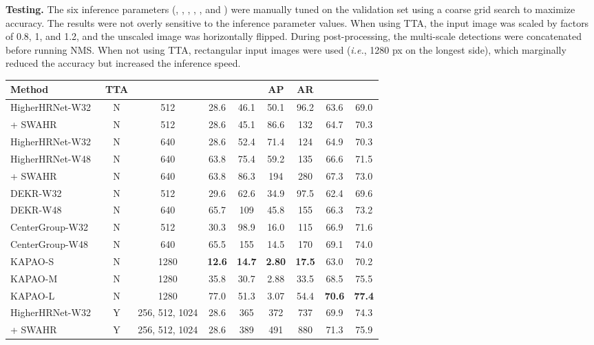 \documentclass[runningheads]{llncs}
\newcommand{\ie}{\textit{i.e.}}
\newcommand\hll[1]{\bgroup
  \hskip0pt\color{black}#1\egroup
}
\newcommand\hlll[1]{\bgroup
  \hskip0pt\color{black}#1\egroup
}
\begin{document}
\medskip\noindent\textbf{Testing.} The six inference parameters (, , , , , and ) were manually tuned on the validation set using a coarse grid search to maximize accuracy. The results were not overly sensitive to the inference parameter values. When using TTA, the input image was scaled by factors of 0.8, 1, and 1.2, and the unscaled image was horizontally flipped. During post-processing, the multi-scale detections \hlll{were} concatenated before running NMS. When not using TTA, rectangular input images were used (\ie, 1280 px on the longest side), which marginally reduced the accuracy but increased the inference speed. 

\begin{table}[t]
\footnotesize
\centering
\begin{tabular}{l|c|c|c|cc|c|c|c}
	\hline
	Method & TTA & \makecell{Input Size(s)} & \makecell{Params\ms)} & \makecell{PP\ms)} & AP & AR\\
	\hline
	HigherHRNet-W32~\cite{cheng2020higherhrnet} & N & 512 & 28.6 & 46.1 & 50.1 & 96.2 & 63.6 & 69.0\\
	\hll{\quad + SWAHR~\cite{luo2021rethinking}} & N & 512 & 28.6 & 45.1 & 86.6 & 132 & 64.7 & 70.3\\
HigherHRNet-W32~\cite{cheng2020higherhrnet} & N & 640 & 28.6 & 52.4 & 71.4 & 124 & 64.9 & 70.3\\  HigherHRNet-W48~\cite{cheng2020higherhrnet} & N & 640 & 63.8 & 75.4 & 59.2 & 135 & 66.6 & 71.5\\
	\hll{\quad + SWAHR~\cite{luo2021rethinking}} & N & 640 & 63.8 & 86.3 & 194 & 280 & 67.3 & 73.0\\ 
DEKR-W32~\cite{geng2021bottom} & N & 512 & 29.6 & 62.6 & 34.9 & 97.5 & 62.4 & 69.6\\ 
	DEKR-W48~\cite{geng2021bottom} & N & 640 & 65.7 & 109 & 45.8 & 155 & 66.3 & 73.2\\
	\hll{CenterGroup-W32~\cite{braso2021center}} & N & 512 & 30.3 & 98.9 & 16.0 & 115 & 66.9 & 71.6\\
\hll{CenterGroup-W48~\cite{braso2021center}} & N & 640 & 65.5 & 155 & 14.5 & 170 & 69.1 & 74.0\\
KAPAO-S & N & 1280 & \textbf{12.6} & \textbf{14.7} & \textbf{2.80} & \textbf{17.5} & 63.0 & 70.2\\  KAPAO-M & N & 1280 & 35.8  & 30.7 & 2.88 & 33.5 & 68.5 & 75.5 \\ 
	KAPAO-L & N & 1280 & 77.0  & 51.3 & 3.07 & 54.4 & \textbf{70.6} & \textbf{77.4} \\
	\hline
	HigherHRNet-W32~\cite{cheng2020higherhrnet} & Y & 256, 512, 1024 & 28.6 & 365 & 372 & 737 & 69.9 & 74.3\\  \hll{\quad + SWAHR~\cite{luo2021rethinking}} & Y & 256, 512, 1024 & 28.6 & 389 & 491 & 880 & 71.3 & 75.9\\

\end{tabular}
\end{table}
\end{document}
